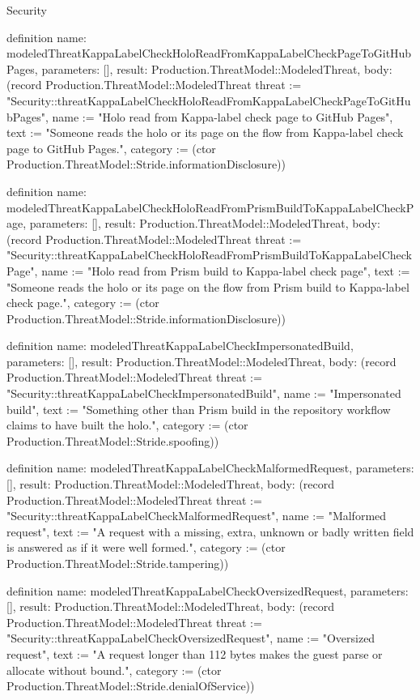 \begin{lexlean}{Security}
\begin{semanticmodule}
definition{
  name: modeledThreatKappaLabelCheckHoloReadFromKappaLabelCheckPageToGitHubPages,
  parameters: [],
  result: Production.ThreatModel::ModeledThreat,
  body: (record Production.ThreatModel::ModeledThreat {threat := "Security::threatKappaLabelCheckHoloReadFromKappaLabelCheckPageToGitHubPages", name := "Holo read from Kappa-label check page to GitHub Pages", text := "Someone reads the holo or its page on the flow from Kappa-label check page to GitHub Pages.", category := (ctor Production.ThreatModel::Stride.informationDisclosure)})
}

definition{
  name: modeledThreatKappaLabelCheckHoloReadFromPrismBuildToKappaLabelCheckPage,
  parameters: [],
  result: Production.ThreatModel::ModeledThreat,
  body: (record Production.ThreatModel::ModeledThreat {threat := "Security::threatKappaLabelCheckHoloReadFromPrismBuildToKappaLabelCheckPage", name := "Holo read from Prism build to Kappa-label check page", text := "Someone reads the holo or its page on the flow from Prism build to Kappa-label check page.", category := (ctor Production.ThreatModel::Stride.informationDisclosure)})
}

definition{
  name: modeledThreatKappaLabelCheckImpersonatedBuild,
  parameters: [],
  result: Production.ThreatModel::ModeledThreat,
  body: (record Production.ThreatModel::ModeledThreat {threat := "Security::threatKappaLabelCheckImpersonatedBuild", name := "Impersonated build", text := "Something other than Prism build in the repository workflow claims to have built the holo.", category := (ctor Production.ThreatModel::Stride.spoofing)})
}

definition{
  name: modeledThreatKappaLabelCheckMalformedRequest,
  parameters: [],
  result: Production.ThreatModel::ModeledThreat,
  body: (record Production.ThreatModel::ModeledThreat {threat := "Security::threatKappaLabelCheckMalformedRequest", name := "Malformed request", text := "A request with a missing, extra, unknown or badly written field is answered as if it were well formed.", category := (ctor Production.ThreatModel::Stride.tampering)})
}

definition{
  name: modeledThreatKappaLabelCheckOversizedRequest,
  parameters: [],
  result: Production.ThreatModel::ModeledThreat,
  body: (record Production.ThreatModel::ModeledThreat {threat := "Security::threatKappaLabelCheckOversizedRequest", name := "Oversized request", text := "A request longer than 112 bytes makes the guest parse or allocate without bound.", category := (ctor Production.ThreatModel::Stride.denialOfService)})
}


\end{semanticmodule}
\end{lexlean}
